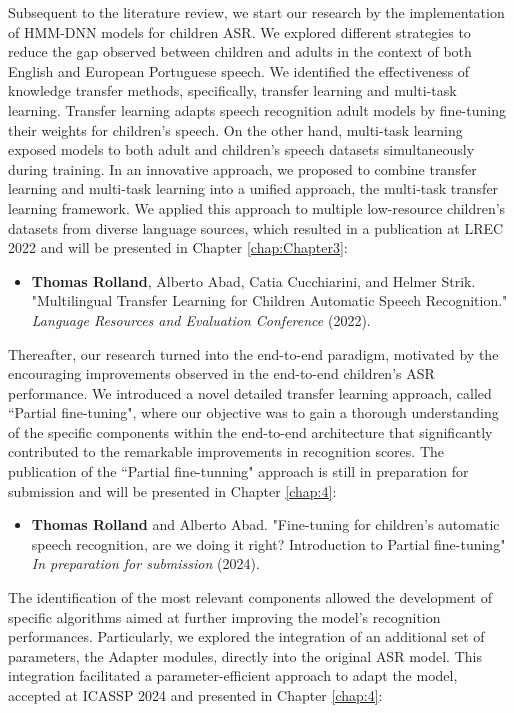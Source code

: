 Subsequent to the literature review, we start our research by the implementation of \ac{HMM-DNN} models for children \ac{ASR}. We explored different strategies to reduce the gap observed between children and adults in the context of both English and European Portuguese speech. We identified the effectiveness of knowledge transfer methods, specifically, transfer learning and multi-task learning. Transfer learning adapts speech recognition adult models by fine-tuning their weights for children's speech. On the other hand, multi-task learning exposed models to both adult and children's speech datasets simultaneously during training. In an innovative approach, we proposed to combine transfer learning and multi-task learning into a unified approach, the multi-task transfer learning framework. We applied this approach to multiple low-resource children's datasets from diverse language sources, which resulted in a publication at LREC 2022 and will be presented in Chapter \ref{chap:Chapter3}:
\begin{itemize}
    \item \textbf{Thomas Rolland}, Alberto Abad, Catia Cucchiarini, and Helmer Strik. "Multilingual Transfer Learning for Children Automatic Speech Recognition." \textit{ Language Resources and Evaluation Conference} (2022).
\end{itemize}

Thereafter, our research turned into the end-to-end paradigm, motivated by the encouraging improvements observed in the end-to-end children's \ac{ASR} performance. We introduced a novel detailed transfer learning approach, called ``Partial fine-tuning", where our objective was to gain a thorough understanding of the specific components within the end-to-end architecture that significantly contributed to the remarkable improvements in recognition scores. The publication of the ``Partial fine-tunning" approach is still in preparation for submission and will be presented in Chapter \ref{chap:4}:

\begin{itemize}
    \item \textbf{Thomas Rolland} and Alberto Abad. "Fine-tuning for children’s automatic speech recognition, are we doing it right? Introduction to Partial fine-tuning" \textit{In preparation for submission} (2024).
\end{itemize}


The identification of the most relevant components allowed the development of specific algorithms aimed at further improving the model's recognition performances. Particularly, we explored the integration of an additional set of parameters, the Adapter modules, directly into the original \ac{ASR} model. This integration facilitated a parameter-efficient approach to adapt the model, accepted at ICASSP 2024 and presented in Chapter \ref{chap:4}:

